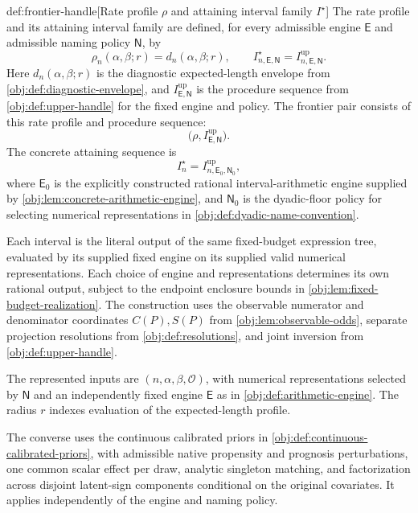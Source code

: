 \documentclass[11pt]{article}
\begin{document}
\begin{definitionv}{def:frontier-handle}[Rate profile $\rho$ and attaining interval family $I^\star$]
The rate profile and its attaining interval family are defined, for every admissible engine \(\mathsf E\) and admissible naming policy \(\mathsf N\), by
\[
\rho_n(\alpha,\beta;r)=d_n(\alpha,\beta;r),
\qquad
I^\star_{n,\mathsf E,\mathsf N}
=
I^{\mathrm{up}}_{n,\mathsf E,\mathsf N}.
\]
Here \(d_n(\alpha,\beta;r)\) is the diagnostic expected-length envelope from \cref{obj:def:diagnostic-envelope}, and \(I^{\mathrm{up}}_{\mathsf E,\mathsf N}\) is the procedure sequence from \cref{obj:def:upper-handle} for the fixed engine and policy. The frontier pair consists of this rate profile and procedure sequence:
\[
\bigl(\rho,I^{\mathrm{up}}_{\mathsf E,\mathsf N}\bigr).
\]
The concrete attaining sequence is
\[
I_n^\star
=
I^{\mathrm{up}}_{n,\mathsf E_0,\mathsf N_0},
\]
where \(\mathsf E_0\) is the explicitly constructed rational interval-arithmetic engine supplied by \cref{obj:lem:concrete-arithmetic-engine}, and \(\mathsf N_0\) is the dyadic-floor policy for selecting numerical representations in \cref{obj:def:dyadic-name-convention}.

Each interval is the literal output of the same fixed-budget expression tree, evaluated by its supplied fixed engine on its supplied valid numerical representations. Each choice of engine and representations determines its own rational output, subject to the endpoint enclosure bounds in \cref{obj:lem:fixed-budget-realization}. The construction uses the observable numerator and denominator coordinates \(C(P),S(P)\) from \cref{obj:lem:observable-odds}, separate projection resolutions from \cref{obj:def:resolutions}, and joint inversion from \cref{obj:def:upper-handle}.

The represented inputs are \((n,\alpha,\beta,\mathcal O)\), with numerical representations selected by \(\mathsf N\) and an independently fixed engine \(\mathsf E\) as in \cref{obj:def:arithmetic-engine}. The radius \(r\) indexes evaluation of the expected-length profile.

The converse uses the continuous calibrated priors in \cref{obj:def:continuous-calibrated-priors}, with admissible native propensity and prognosis perturbations, one common scalar effect per draw, analytic singleton matching, and factorization across disjoint latent-sign components conditional on the original covariates. It applies independently of the engine and naming policy.


\end{definitionv}
\end{document}
